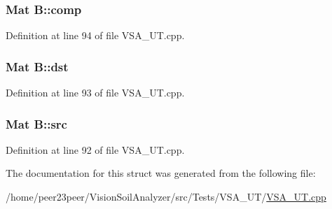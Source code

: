 \subsubsection[{comp}]{\setlength{\rightskip}{0pt plus 5cm}Mat B\+::comp}\label{struct_b_a255bb9e995f9115cb12fef9911dcfc2e}


Definition at line 94 of file V\+S\+A\+\_\+\+U\+T.\+cpp.

\hypertarget{struct_b_a42c8a8a887d60baf5cad68219df40aa3}{}
\subsubsection[{dst}]{\setlength{\rightskip}{0pt plus 5cm}Mat B\+::dst}\label{struct_b_a42c8a8a887d60baf5cad68219df40aa3}


Definition at line 93 of file V\+S\+A\+\_\+\+U\+T.\+cpp.

\hypertarget{struct_b_a678f871ba71d1e313ef4f02c72daff60}{}
\subsubsection[{src}]{\setlength{\rightskip}{0pt plus 5cm}Mat B\+::src}\label{struct_b_a678f871ba71d1e313ef4f02c72daff60}


Definition at line 92 of file V\+S\+A\+\_\+\+U\+T.\+cpp.



The documentation for this struct was generated from the following file\+:\begin{DoxyCompactItemize}
\item 
/home/peer23peer/\+Vision\+Soil\+Analyzer/src/\+Tests/\+V\+S\+A\+\_\+\+U\+T/\hyperlink{_v_s_a___u_t_8cpp}{V\+S\+A\+\_\+\+U\+T.\+cpp}\end{DoxyCompactItemize}
